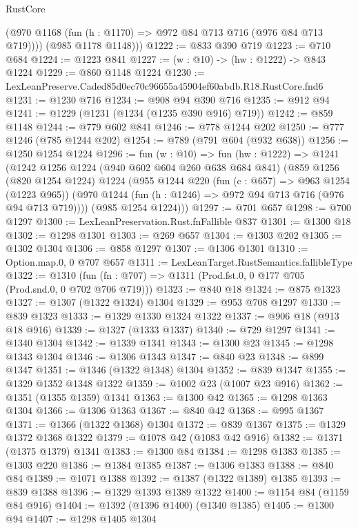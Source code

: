 \begin{lexlean}{RustCore}
\begin{coremodule}
          (@970 @1168 (fun (h : @1170) => @972 @84 @713 @716 (@976 @84 @713 @719))))
        (@985 @1178 @1148)))
@1222 := @833 @390 @719
@1223 := @710 @684
@1224 := @1223 @841
@1227 := (w : @10) -> (hw : @1222) -> @843 @1224
@1229 := @860 @1148 @1224
@1230 := LexLeanPreserve.Caded85d0ec70c96655a45904ef60abdb.R18.RustCore.fnd6
@1231 := @1230 @716
@1234 := @908 @94 @390 @716
@1235 := @912 @94
@1241 := @1229 (@1231 (@1234 (@1235 @390 @916) @719))
@1242 := @859 @1148
@1244 := @779 @602 @841
@1246 := @778 @1244 @202
@1250 := @777 @1246 (@785 @1244 @202)
@1254 := @789 (@791 @604 (@932 @638))
@1256 := @1250 @1254 @1224
@1296 := fun (w : @10) =>
  fun (hw : @1222) =>
  @1241
    (@1242
      @1256
      @1224
      (@940 @602 @604 @260 @638 @684 @841)
      (@859
        @1256
        (@820 @1254 @1224)
        @1224
        (@955
          @1244
          @220
          (fun (c : @657) => @963 @1254 (@1223 @965))
          (@970 @1244 (fun (h : @1246) => @972 @94 @713 @716 (@976 @94 @713 @719))))
        (@985 @1254 @1224)))
@1297 := @701 @657
@1298 := @700 @1297
@1300 := LexLeanPreservation.Rust.fnFallible @837
@1301 := @1300 @18
@1302 := @1298 @1301
@1303 := @269 @657
@1304 := @1303 @202
@1305 := @1302 @1304
@1306 := @858 @1297
@1307 := @1306 @1301
@1310 := Option.map.{0, 0} @707 @657
@1311 := LexLeanTarget.RustSemantics.fallibleType
@1322 := @1310
    (fun (fn : @707) => @1311 (Prod.fst.{0, 0} @177 @705 (Prod.snd.{0, 0} @702 @706 @719)))
@1323 := @840 @18
@1324 := @875 @1323
@1327 := @1307 (@1322 @1324) @1304
@1329 := @953 @708 @1297
@1330 := @839 @1323
@1333 := @1329 @1330 @1324 @1322
@1337 := @906 @18 (@913 @18 @916)
@1339 := @1327 (@1333 @1337)
@1340 := @729 @1297
@1341 := @1340 @1304
@1342 := @1339 @1341
@1343 := @1300 @23
@1345 := @1298 @1343 @1304
@1346 := @1306 @1343
@1347 := @840 @23
@1348 := @899 @1347
@1351 := @1346 (@1322 @1348) @1304
@1352 := @839 @1347
@1355 := @1329 @1352 @1348 @1322
@1359 := @1002 @23 (@1007 @23 @916)
@1362 := @1351 (@1355 @1359) @1341
@1363 := @1300 @42
@1365 := @1298 @1363 @1304
@1366 := @1306 @1363
@1367 := @840 @42
@1368 := @995 @1367
@1371 := @1366 (@1322 @1368) @1304
@1372 := @839 @1367
@1375 := @1329 @1372 @1368 @1322
@1379 := @1078 @42 (@1083 @42 @916)
@1382 := @1371 (@1375 @1379) @1341
@1383 := @1300 @84
@1384 := @1298 @1383
@1385 := @1303 @220
@1386 := @1384 @1385
@1387 := @1306 @1383
@1388 := @840 @84
@1389 := @1071 @1388
@1392 := @1387 (@1322 @1389) @1385
@1393 := @839 @1388
@1396 := @1329 @1393 @1389 @1322
@1400 := @1154 @84 (@1159 @84 @916)
@1404 := @1392 (@1396 @1400) (@1340 @1385)
@1405 := @1300 @94
@1407 := @1298 @1405 @1304

\end{coremodule}
\end{lexlean}
